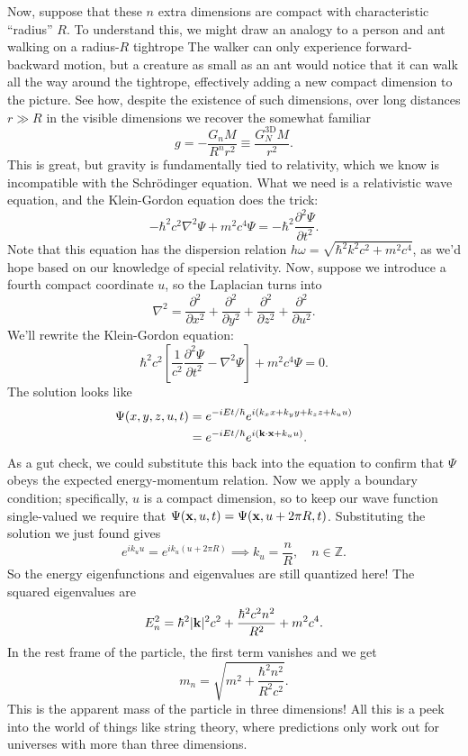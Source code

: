 \documentclass[../p052main.tex]{subfiles}
\begin{document}
Now, suppose that these $n$ extra dimensions are compact with characteristic ``radius'' $R$.
To understand this, we might draw an analogy to a person and ant walking on a radius-$R$ tightrope
The walker can only experience forward-backward motion, but a creature as small as an ant would notice that it can walk all the way around the tightrope, effectively adding a new compact dimension to the picture.
See how, despite the existence of such dimensions, over long distances $r \gg R$ in the visible dimensions we recover the somewhat familiar
\[ g = -\frac{G_n M}{R^n r^2} \equiv \frac{G_N^\textrm{3D} M}{r^2}. \]
This is great, but gravity is fundamentally tied to relativity, which we know is incompatible with the Schrödinger equation.
What we need is a relativistic wave equation, and the Klein-Gordon equation does the trick:
\[ -\hbar^2 c^2 \nabla^2 \Psi + m^2 c^{4} \Psi = -\hbar^2 \frac{\partial^2 \Psi}{\partial t^2}. \]
Note that this equation has the dispersion relation $h \omega = \sqrt{\hbar^2 k^2 c^2 + m^2 c^{4}}$, as we'd hope based on our knowledge of special relativity.
Now, suppose we introduce a fourth compact coordinate $u$, so the Laplacian turns into
\[ \nabla^2 = \frac{\partial^2}{\partial x^2} + \frac{\partial^2}{\partial y^2} + \frac{\partial^2}{\partial z^2} + \frac{\partial^2}{\partial u^2}. \]
We'll rewrite the Klein-Gordon equation:
\[ \hbar^2 c^2 \left[ \frac{1}{c^2} \frac{\partial^2 \Psi}{\partial t^2} - \nabla^2 \Psi \right] + m^2 c^{4} \Psi = 0. \]
The solution looks like
\begin{align*}
    \Psi(x,y,z,u,t) &= e^{-iEt / \hbar} e^{i(k_xx + k_yy + k_zz + k_uu)} \\
    &= e^{-iEt / \hbar} e^{i(\mathbf{k} \cdot \mathbf{x} + k_uu)}.
\end{align*}
As a gut check, we could substitute this back into the equation to confirm that $\Psi$ obeys the expected energy-momentum relation.
Now we apply a boundary condition; specifically, $u$ is a compact dimension, so to keep our wave function single-valued we require that $\Psi(\mathbf{x},u,t) = \Psi(\mathbf{x},u + 2\pi R,t)$.
Substituting the solution we just found gives
\[ e^{ik_uu} = e^{ik_u (u + 2\pi R)} \implies k_u = \frac{n}{R}, \quad n \in \mathbb{Z}. \]
So the energy eigenfunctions and eigenvalues are still quantized here!
The squared eigenvalues are
\[ E_n^2 = \hbar^2 |\mathbf{k}|^2 c^2 + \frac{\hbar^2 c^2 n^2}{R^2} + m^2 c^{4}. \]
In the rest frame of the particle, the first term vanishes and we get
\[ m_n = \sqrt{m^2 + \frac{\hbar^2 n^2}{R^2 c^2}}. \]
This is the apparent mass of the particle in three dimensions!
All this is a peek into the world of things like string theory, where predictions only work out for universes with more than three dimensions.
\end{document}
